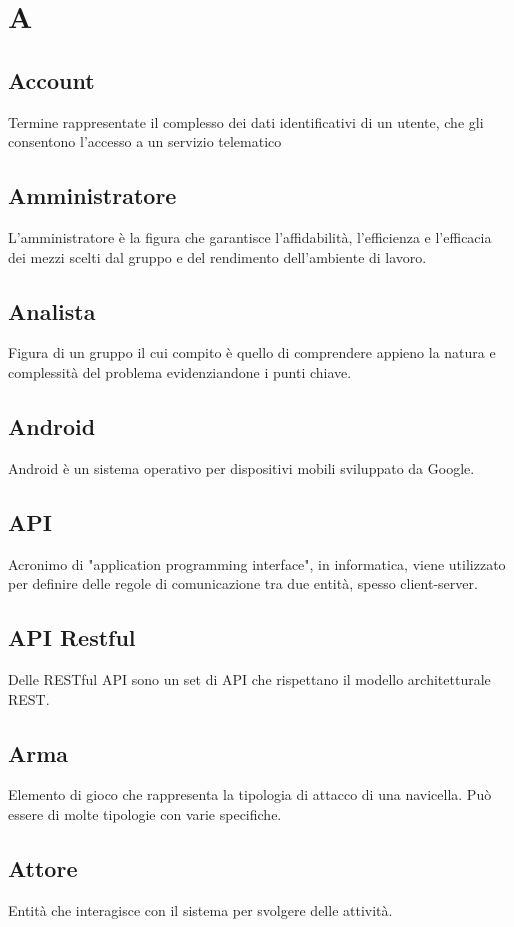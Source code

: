 \section{A}
	\subsection{Account}
		Termine rappresentate il complesso dei dati identificativi di un utente, che gli consentono l'accesso a un servizio telematico
	\subsection{Amministratore}  
		L'amministratore è la figura che garantisce l’affidabilità, l’efficienza e l’efficacia dei mezzi scelti dal gruppo e del rendimento dell’ambiente di lavoro.
	\subsection{Analista}  
		Figura di un gruppo il cui compito è quello di comprendere appieno la natura e complessità del problema evidenziandone i punti chiave.
    \subsection{Android}
        Android è un sistema operativo per dispositivi mobili sviluppato da Google.
	\subsection{API}  
		Acronimo di "application programming interface", in informatica, viene utilizzato per definire delle regole di comunicazione tra due entità, spesso client-server.
	\subsection{API Restful}  
		Delle RESTful API sono un set di API che rispettano il modello architetturale REST.
    \subsection{Arma}
        Elemento di gioco che rappresenta la tipologia di attacco di una navicella. Può essere di molte tipologie con varie specifiche.
	\subsection{Attore}
		Entità che interagisce con il sistema per svolgere delle attività.
